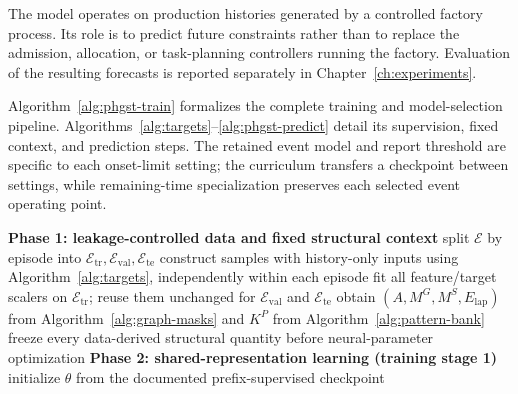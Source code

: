The model operates on production histories generated by a controlled factory process. Its role is to predict future constraints rather than to replace the admission, allocation, or task-planning controllers running the factory. Evaluation of the resulting forecasts is reported separately in Chapter~\ref{ch:experiments}.

Algorithm~\ref{alg:phgst-train} formalizes the complete training and model-selection pipeline. Algorithms~\ref{alg:targets}--\ref{alg:phgst-predict} detail its supervision, fixed context, and prediction steps. The retained event model and report threshold are specific to each onset-limit setting; the curriculum transfers a checkpoint between settings, while remaining-time specialization preserves each selected event operating point.

\begin{algorithm}[p]
\singlespacing
\footnotesize
\SetAlFnt{\footnotesize}
\SetAlCapFnt{\small}
\SetAlCapNameFnt{\small\bfseries}
\SetInd{0.5em}{0.8em}
\caption{End-to-end PHGST-DM training, selection, and held-out evaluation.}
\label{alg:phgst-train}
\BlankLine
\textbf{Phase 1: leakage-controlled data and fixed structural context}\;
split $\mathcal{E}$ by episode into $\mathcal{E}_{\mathrm{tr}},\mathcal{E}_{\mathrm{val}},\mathcal{E}_{\mathrm{te}}$\;
construct samples with history-only inputs using Algorithm~\ref{alg:targets}, independently within each episode\;
fit all feature/target scalers on $\mathcal{E}_{\mathrm{tr}}$; reuse them unchanged for $\mathcal{E}_{\mathrm{val}}$ and $\mathcal{E}_{\mathrm{te}}$\;
obtain $(A,M^{G},M^{S},E_{\mathrm{lap}})$ from Algorithm~\ref{alg:graph-masks} and $K^{P}$ from Algorithm~\ref{alg:pattern-bank}\;
freeze every data-derived structural quantity before neural-parameter optimization 
\BlankLine
\textbf{Phase 2: shared-representation learning (training stage 1)}\;
initialize $\theta$ from the documented prefix-supervised checkpoint\;
\end{algorithm}
